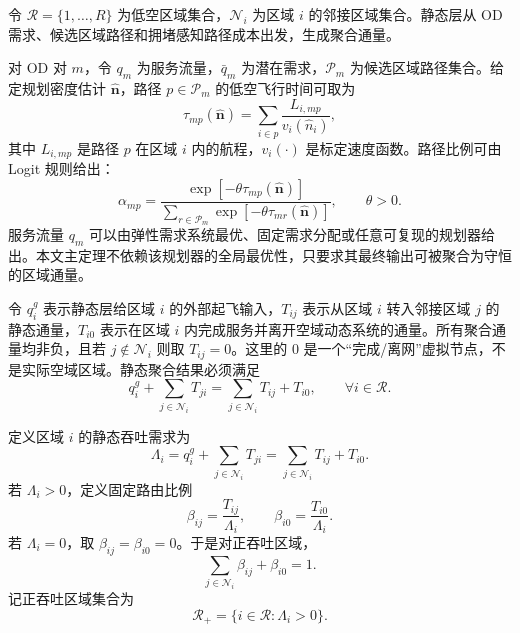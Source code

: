 \documentclass[a4paper,12pt]{article}
\theoremstyle{plain}
\theoremstyle{definition}
\theoremstyle{remark}
\begin{document}
令 $\mathcal R=\{1,\ldots,R\}$ 为低空区域集合，$\mathcal N_i$ 为区域 $i$ 的邻接区域集合。静态层从 OD 需求、候选区域路径和拥堵感知路径成本出发，生成聚合通量。

对 OD 对 $m$，令 $q_m$ 为服务流量，$\bar q_m$ 为潜在需求，$\mathcal P_m$ 为候选区域路径集合。给定规划密度估计 $\hat{\bm n}$，路径 $p\in\mathcal P_m$ 的低空飞行时间可取为
\begin{equation}\label{eq:path_time}
    \tau_{mp}(\hat{\bm n})
    =
    \sum_{i\in p}\frac{L_{i,mp}}{v_i(\hat n_i)} ,
\end{equation}
其中 $L_{i,mp}$ 是路径 $p$ 在区域 $i$ 内的航程，$v_i(\cdot)$ 是标定速度函数。路径比例可由 Logit 规则给出：
\begin{equation}\label{eq:logit}
    \alpha_{mp}
    =
    \frac{\exp[-\theta \tau_{mp}(\hat{\bm n})]}
    {\sum_{r\in\mathcal P_m}\exp[-\theta \tau_{mr}(\hat{\bm n})]},
    \qquad \theta>0 .
\end{equation}
服务流量 $q_m$ 可以由弹性需求系统最优、固定需求分配或任意可复现的规划器给出。本文主定理不依赖该规划器的全局最优性，只要求其最终输出可被聚合为守恒的区域通量。

令 $q_i^g$ 表示静态层给区域 $i$ 的外部起飞输入，$T_{ij}$ 表示从区域 $i$ 转入邻接区域 $j$ 的静态通量，$T_{i0}$ 表示在区域 $i$ 内完成服务并离开空域动态系统的通量。所有聚合通量均非负，且若 $j\notin\mathcal N_i$ 则取 $T_{ij}=0$。这里的 $0$ 是一个“完成/离网”虚拟节点，不是实际空域区域。静态聚合结果必须满足
\begin{equation}\label{eq:static_conservation}
    q_i^g+\sum_{j\in\mathcal N_i}T_{ji}
    =
    \sum_{j\in\mathcal N_i}T_{ij}+T_{i0},
    \qquad \forall i\in\mathcal R .
\end{equation}

定义区域 $i$ 的静态吞吐需求为
\begin{equation}\label{eq:lambda}
    \Lambda_i
    =
    q_i^g+\sum_{j\in\mathcal N_i}T_{ji}
    =
    \sum_{j\in\mathcal N_i}T_{ij}+T_{i0}.
\end{equation}
若 $\Lambda_i>0$，定义固定路由比例
\begin{equation}\label{eq:beta}
    \beta_{ij}=\frac{T_{ij}}{\Lambda_i},
    \qquad
    \beta_{i0}=\frac{T_{i0}}{\Lambda_i}.
\end{equation}
若 $\Lambda_i=0$，取 $\beta_{ij}=\beta_{i0}=0$。于是对正吞吐区域，
\begin{equation}\label{eq:beta_sum}
    \sum_{j\in\mathcal N_i}\beta_{ij}+\beta_{i0}=1.
\end{equation}
记正吞吐区域集合为
\begin{equation}\label{eq:positive_regions}
    \mathcal R_+=\{i\in\mathcal R:\Lambda_i>0\}.
\end{equation}
\end{document}

